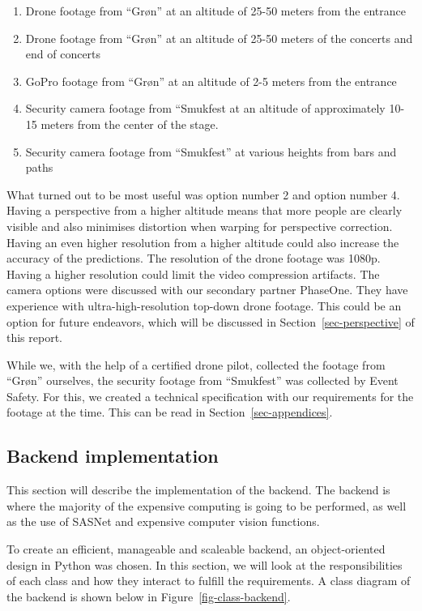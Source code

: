 \documentclass[
]{article}
\begin{document}
\begin{enumerate}
\def\labelenumi{\arabic{enumi}.}
\item
  Drone footage from ``Grøn'' at an altitude of 25-50 meters from the
  entrance
\item
  Drone footage from ``Grøn'' at an altitude of 25-50 meters of the
  concerts and end of concerts
\item
  GoPro footage from ``Grøn'' at an altitude of 2-5 meters from the
  entrance
\item
  Security camera footage from ``Smukfest at an altitude of
  approximately 10-15 meters from the center of the stage.
\item
  Security camera footage from ``Smukfest'' at various heights from bars
  and paths
\end{enumerate}

What turned out to be most useful was option number 2 and option number
4. Having a perspective from a higher altitude means that more people
are clearly visible and also minimises distortion when warping for
perspective correction. Having an even higher resolution from a higher
altitude could also increase the accuracy of the predictions. The
resolution of the drone footage was 1080p. Having a higher resolution
could limit the video compression artifacts. The camera options were
discussed with our secondary partner PhaseOne. They have experience with
ultra-high-resolution top-down drone footage. This could be an option
for future endeavors, which will be discussed in
Section~\ref{sec-perspective} of this report.

While we, with the help of a certified drone pilot, collected the
footage from ``Grøn'' ourselves, the security footage from ``Smukfest''
was collected by Event Safety. For this, we created a technical
specification with our requirements for the footage at the time. This
can be read in Section~\ref{sec-appendices}.

\hypertarget{sec-backend}{%
\subsection{Backend implementation}\label{sec-backend}}

This section will describe the implementation of the backend. The
backend is where the majority of the expensive computing is going to be
performed, as well as the use of SASNet and expensive computer vision
functions.

To create an efficient, manageable and scaleable backend, an
object-oriented design in Python was chosen. In this section, we will
look at the responsibilities of each class and how they interact to
fulfill the requirements. A class diagram of the backend is shown below
in Figure~\ref{fig-class-backend}.
\end{document}

